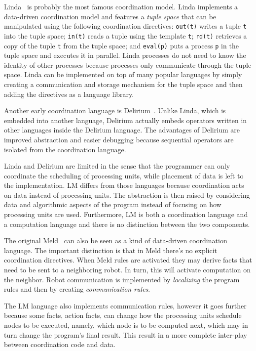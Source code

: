 Linda~\cite{linda} is probably the most famous coordination model. Linda
implements a data-driven coordination model and features a \emph{tuple space}
that can be manipulated using the following coordination directives:
\texttt{out(t)} writes a tuple \texttt{t} into the tuple space; \texttt{in(t)}
reads a tuple using the template \texttt{t}; \texttt{rd(t)} retrieves a copy of
the tuple \texttt{t} from the tuple space; and \texttt{eval(p)} puts a process
\texttt{p} in the tuple space and executes it in parallel.  Linda processes do
not need to know the identity of other processes because processes only
communicate through the tuple space.  Linda can be implemented on top of many
popular languages by simply creating a communication and storage mechanism for
the tuple space and then adding the directives as a language library.

Another early coordination language is Delirium~\cite{Delirium}. Unlike Linda,
which is embedded into another language, Delirium actually embeds operators
written in other languages inside the Delirium language. The advantages of
Delirium are improved abstraction and easier debugging because sequential
operators are isolated from the coordination language.

Linda and Delirium are limited in the sense that the programmer can only
coordinate the scheduling of processing units, while placement of data is left
to the implementation. LM differs from those languages because coordination acts
on data instead of processing units. The abstraction is then raised by
considering data and algorithmic aspects of the program instead of focusing on
how processing units are used. Furthermore, LM is both a coordination language
and a computation language and there is no distinction between the two
components.

The original Meld~\cite{ashley-rollman-iclp09} can also be seen as a kind of
data-driven coordination language. The important distinction is that in Meld
there's no explicit coordination directives. When Meld rules are activated they
may derive facts that need to be sent to a neighboring robot. In turn, this will
activate computation on the neighbor. Robot communication is implemented by
\emph{localizing} the program rules and then by creating \emph{communication
rules}.

The LM language also implements communication rules, however it goes further
because some facts, action facts, can change how the processing units schedule
nodes to be executed, namely, which node is to be computed next, which may in
turn change the program's final result. This result in a more complete
inter-play between coordination code and data.


